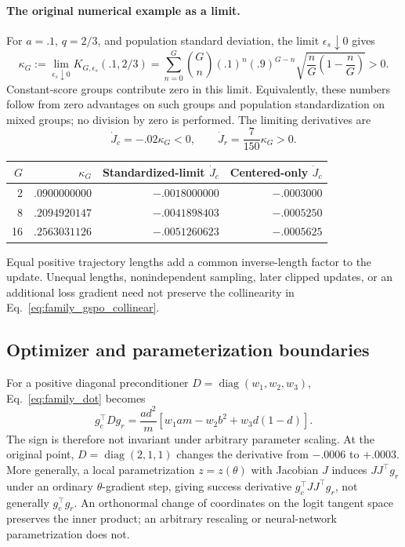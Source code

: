\documentclass[11pt]{article}
\newcommand{\diag}{\operatorname{diag}}
\begin{document}
\paragraph{The original numerical example as a limit.}
For $a=.1$, $q=2/3$, and population standard deviation, the limit $\epsilon_s\downarrow0$ gives
\begin{equation}
\kappa_G:=\lim_{\epsilon_s\downarrow0}K_{G,\epsilon_s}(.1,2/3)
=\sum_{n=0}^G {G\choose n}(.1)^n(.9)^{G-n}
\sqrt{\frac nG\left(1-\frac nG\right)}>0.
\label{eq:kappa}
\end{equation}
Constant-score groups contribute zero in this limit. Equivalently, these numbers follow from zero advantages on such groups and population standardization on mixed groups; no division by zero is performed. The limiting derivatives are
\begin{equation}
\dot J_c=-.02\kappa_G<0,\qquad
\dot J_r=\frac7{150}\kappa_G>0.
\label{eq:gspodots}
\end{equation}
\begin{center}
\renewcommand{\arraystretch}{1.15}
\begin{tabular}{rrrr}
\toprule
$G$ & $\kappa_G$ & Standardized-limit $\dot J_c$ & Centered-only $\dot J_c$\\
\midrule
2 & $.0900000000$ & $-.0018000000$ & $-.0003000$\\
8 & $.2094920147$ & $-.0041898403$ & $-.0005250$\\
16 & $.2563031126$ & $-.0051260623$ & $-.0005625$\\
\bottomrule
\end{tabular}
\end{center}

Equal positive trajectory lengths add a common inverse-length factor to the update. Unequal lengths, nonindependent sampling, later clipped updates, or an additional loss gradient need not preserve the collinearity in Eq.~\eqref{eq:family_gspo_collinear}.

\subsection{Optimizer and parameterization boundaries}
\label{sec:family_coordinates}
For a positive diagonal preconditioner
$D=\diag(w_1,w_2,w_3)$, Eq.~\eqref{eq:family_dot} becomes
\begin{equation}
 g_c^\top Dg_r=\frac{ad^2}{m}
 \left[w_1am-w_2b^2+w_3d(1-d)\right].
 \label{eq:family_preconditioner}
\end{equation}
The sign is therefore not invariant under arbitrary parameter scaling.
At the original point, $D=\diag(2,1,1)$ changes the derivative from
$-.0006$ to $+.0003$.
More generally, a local parametrization $z=z(\theta)$ with Jacobian $J$
induces $JJ^\top g_r$ under an ordinary $\theta$-gradient step, giving success
derivative $g_c^\top JJ^\top g_r$, not generally $g_c^\top g_r$.
An orthonormal change of coordinates on the logit tangent space preserves
the inner product; an arbitrary rescaling or neural-network parametrization
does not.
\end{document}
